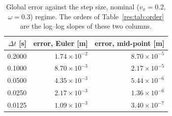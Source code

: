 \begin{table}[htbp]
  \centering
  \small
  \caption{Global error against the step size, nominal ($v_x=0.2$, $\omega=0.3$) regime. The orders of Table~\ref{res:tab:order} are the log--log slopes of these two columns.}
  \label{res:tab:ordergrid}
  \begin{tabular}{rrr}
    \toprule
    $\Delta t$ [s] & error, Euler [m] & error, mid-point [m] \\
    \midrule
    0.2000 & $1.74\times 10^{-2}$ & $8.70\times 10^{-5}$ \\
    0.1000 & $8.70\times 10^{-3}$ & $2.17\times 10^{-5}$ \\
    0.0500 & $4.35\times 10^{-3}$ & $5.44\times 10^{-6}$ \\
    0.0250 & $2.17\times 10^{-3}$ & $1.36\times 10^{-6}$ \\
    0.0125 & $1.09\times 10^{-3}$ & $3.40\times 10^{-7}$ \\
    \bottomrule
  \end{tabular}
\end{table}

